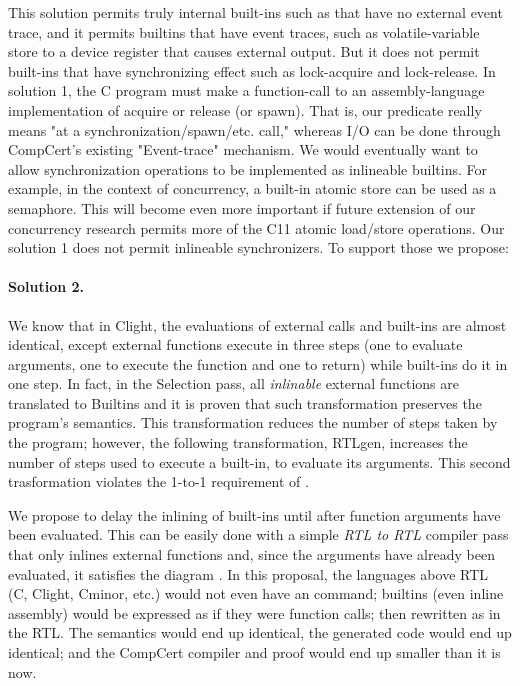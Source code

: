 This solution permits truly internal built-ins such as  that have no external event trace, and it permits builtins that have event traces, such as volatile-variable store to a device register that causes external output.  But it does not permit built-ins that have synchronizing effect such as lock-acquire and lock-release.  In solution 1, the C program must make a function-call to an assembly-language implementation of acquire or release (or spawn).  That is, our  predicate really means "at a synchronization/spawn/etc. call," whereas I/O can be done through CompCert's existing "Event-trace" mechanism. We would eventually want to allow synchronization operations to be implemented as inlineable builtins. For example, in the context of concurrency, a built-in atomic store %
can be used as a semaphore. This will become even more important if future extension of our concurrency research permits more of the C11 atomic load/store operations.  Our solution 1 does not permit inlineable synchronizers. To support those we propose:

\paragraph{Solution 2.}  We know that in Clight, the evaluations of external calls and built-ins are almost identical, except external functions execute in three steps (one to evaluate arguments, one to execute the function and one to return) while built-ins do it in one step. In fact, in the Selection pass, all \emph{inlinable} external functions are translated to Builtins and it is proven that such transformation preserves the program's semantics. This transformation reduces the number of steps taken by the program; however, the following transformation, RTLgen, increases the number of steps used to execute a built-in, to evaluate its arguments. This second trasformation violates the 1-to-1 requirement of .

We propose to delay the inlining of built-ins until after function arguments have been evaluated. This can be easily done with a simple \emph{RTL to RTL} compiler pass that only inlines external functions and, since the arguments have already been evaluated,  it satisfies the diagram  . In this proposal, the languages above RTL (C, Clight, Cminor, etc.) would not even have an  command; builtins (even inline assembly) would be expressed as if they were function calls; then rewritten as  in the RTL.  The semantics would end up identical, the generated code would end up identical; and the CompCert compiler and proof would end up smaller than it is now.

